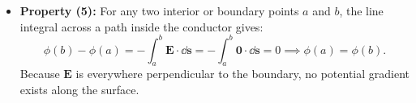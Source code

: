 \begin{proofbox}
\begin{itemize}
        To find the normal component \(E_n = \bm{E}\cdot\hat{\bm{n}}\), construct a small cylindrical Gaussian pillbox of cross-sectional area \(A\) across \(\partial\Omega\):
        \begin{equation}
            \Phi_E = \Phi_{\text{top}} + \Phi_{\text{bottom}} + \Phi_{\text{lateral}}.
        \end{equation}
        Because \(\bm{E} = \bm{0}\) inside the conductor, \(\Phi_{\text{bottom}} = 0\). As pillbox height tends to zero, the lateral flux vanishes. The flux through the exterior cap is \(\Phi_E = E_n A\). Applying Gauss's law:
        \begin{equation}
            E_n A = \frac{Q_{\text{enc}}}{\epsilon_0} = \frac{\sigma A}{\epsilon_0} \implies E_n = \frac{\sigma}{\epsilon_0} \implies \bm{E} = \frac{\sigma}{\epsilon_0}\hat{\bm{n}}.
        \end{equation}

        \item \textbf{Property (5):} For any two interior or boundary points \(a\) and \(b\), the line integral across a path inside the conductor gives:
        \begin{equation}
            \phi(b) - \phi(a) = -\int_a^b \bm{E}\cdot\dd\bm{s} = -\int_a^b \bm{0}\cdot\dd\bm{s} = 0 \implies \phi(a) = \phi(b).
        \end{equation}
        Because \(\bm{E}\) is everywhere perpendicular to the boundary, no potential gradient exists along the surface.
    \end{itemize}
\end{proofbox}


